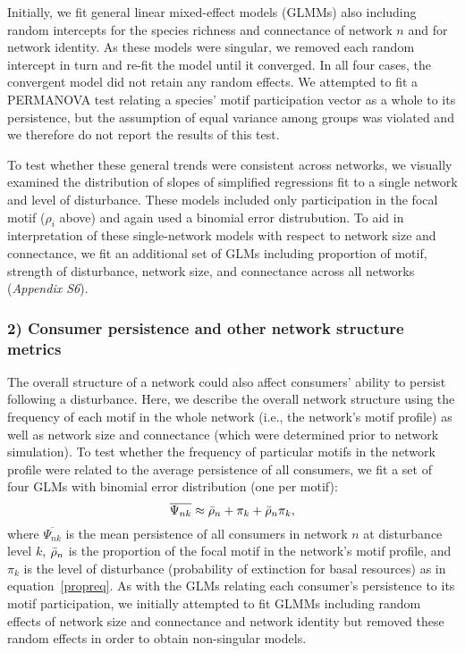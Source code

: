 \documentclass[12pt]{article}
\begin{document}
\begin{spacing}{2.0}
            
            
            Initially, we fit general linear mixed-effect models (GLMMs) also including random  intercepts for the species richness and connectance of network $n$ and for network identity.
            As these models were singular, we removed each random intercept in turn and re-fit the model until it converged.
            In all four cases, the convergent model did not retain any random effects.
            We attempted to fit a PERMANOVA test relating a species' motif participation vector as a whole to its persistence, but the assumption of equal variance among groups was violated and we therefore do not report the results of this test.
            
            
            To test whether these general trends were consistent across networks, we visually examined the distribution of slopes of simplified regressions fit to a single network and level of disturbance.
            These models included only participation in the focal motif ($\rho_{i}$ above) and again used a binomial error distrubution.
            To aid in interpretation of these single-network models with respect to network size and connectance, we fit an additional set of GLMs including proportion of motif, strength of disturbance, network size, and connectance across all networks (\emph{Appendix S6}).



        \subsubsection*{2) Consumer persistence and other network structure metrics}

            The overall structure of a network could also affect consumers' ability to persist following a disturbance.
            Here, we describe the overall network structure using the frequency of each motif in the whole network (i.e., the network's motif profile) as well as network size and connectance (which were determined prior to network simulation).
            To test whether the frequency of particular motifs in the network profile were related to the average persistence of all consumers, we fit a set of four GLMs with binomial error distribution (one per motif):
                \begin{equation}
                    \overline{\Psi_{nk}} \approx \Bar{\rho}_{n} + \pi_{k} + \Bar{\rho}_{n}\pi_{k},
                    \label{netpropeq}
                \end{equation}
            \noindent where $\overline{\Psi_{nk}}$ is the mean persistence of all consumers in network $n$ at disturbance level $k$, $\Bar{\rho}_{n}$ is the proportion of the focal motif in the network's motif profile, and $\pi_k$ is the level of disturbance (probability of extinction for basal resources) as in equation~\ref{propreq}.
            As with the GLMs relating each consumer's persistence to its motif participation, we initially attempted to fit GLMMs including random effects of network size and connectance and network identity but removed these random effects in order to obtain non-singular models.



\end{spacing}
\end{document}
